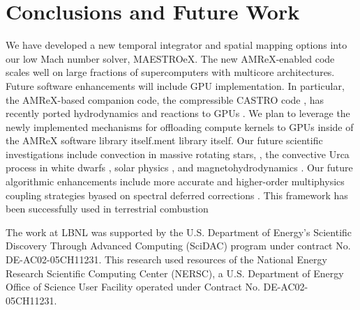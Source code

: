 \section{Conclusions and Future Work}\label{sec:conclusions}
We have developed a new temporal integrator and spatial mapping options into our low Mach number solver, MAESTROeX.
The new AMReX-enabled code scales well on large fractions of supercomputers with multicore architectures.
Future software enhancements will include GPU implementation.
In particular, the AMReX-based companion code, the compressible CASTRO code \citep{CASTRO}, has recently ported hydrodynamics and reactions to GPUs \citep{CASTRO_GPU}.
We plan to leverage the newly implemented mechanisms for offloading compute kernels to GPUs inside of the AMReX software library itself.ment library itself.
Our future scientific investigations include convection in massive rotating stars, \citep{heger2000presupernova}, the convective Urca process in white dwarfs \citep{willcox2016type}, solar physics \citep{wood2018self}, and magnetohydrodynamics \citep{wood2015three,wood2011sun}.
Our future algorithmic enhancements include more accurate and higher-order multiphysics coupling strategies byased on spectral deferred corrections \citep{dutt2000spectral,bourlioux2003high}.
This framework has been successfully used in terrestrial combustion \citep{pazner2016high,nonaka2018conservative}

\acknowledgements

The work at LBNL was supported by the U.S. Department of Energy's Scientific Discovery Through Advanced Computing (SciDAC) program under contract No. DE-AC02-05CH11231.
This research used resources of the National Energy Research Scientific Computing Center (NERSC), a U.S. Department of Energy Office of Science User Facility operated under Contract No. DE-AC02-05CH11231.
